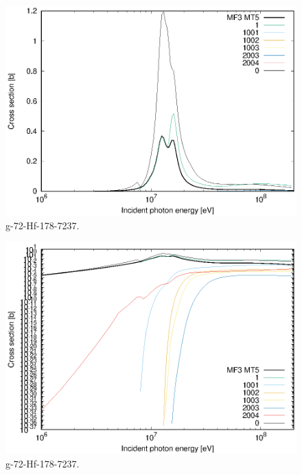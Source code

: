 \begin{figure}
 \includegraphics[width=\linewidth]{eps/g_72-Hf-178_7237.eps}
  \caption{g-72-Hf-178-7237.}
\end{figure}
\begin{figure}
 \includegraphics[width=\linewidth]{eps-log/g_72-Hf-178_7237.eps}
 \caption{g-72-Hf-178-7237.}
\end{figure}
\newpage \clearpage

